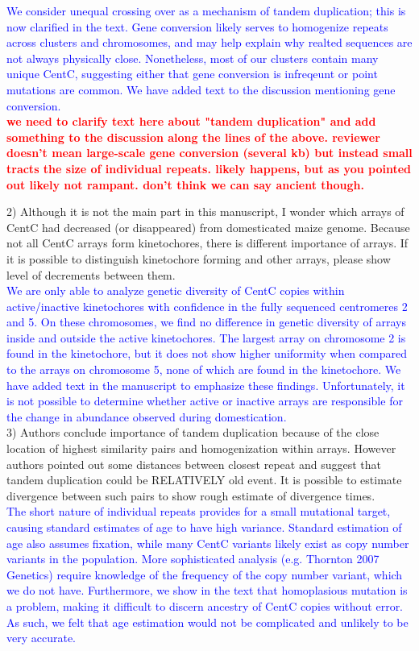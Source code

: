 \documentclass[]{article}
\newcommand{\res}[1]{\noindent \textcolor{blue}{{#1}} \\}
\newcommand{\jri}[1]{\textcolor{red}{{\bf #1}} }
\begin{document}
\res{We consider unequal crossing over as a mechanism of tandem duplication; this is now clarified in the text.
Gene conversion likely serves to homogenize repeats across clusters and chromosomes, and may help explain why realted sequences are not always physically close.
Nonetheless, most of our clusters contain many unique CentC, suggesting either that gene conversion is infreqeunt or point mutations are common. 
We have added text to the discussion mentioning gene conversion.} 
\jri{we need to clarify text here about "tandem duplication" and add something to the discussion along the lines of the above.  reviewer doesn't mean large-scale gene conversion (several kb) but instead small tracts the size of individual repeats.  likely happens, but as you pointed out likely not rampant.  don't think we can say ancient though.\\} 

2) Although it is not the main part in this manuscript, I wonder which arrays of CentC had decreased (or disappeared) from domesticated maize genome. Because not all CentC arrays form kinetochores, there is different importance of arrays. If it is possible to distinguish kinetochore forming and other arrays, please show level of decrements between them.\\

\res{We are only able to analyze genetic diversity of CentC copies within active/inactive kinetochores with confidence in the fully sequenced centromeres 2 and 5.  
On these chromosomes, we find no difference in genetic diversity of arrays inside and outside the active kinetochores.  
The largest array on chromosome 2 is found in the kinetochore, but it does not show higher uniformity when compared to the arrays on chromosome 5, none of which are found in the kinetochore.  
We have added text in the manuscript to emphasize these findings.
Unfortunately, it is not possible to determine whether active or inactive arrays are responsible for the change in abundance observed during domestication.}

3) Authors conclude importance of tandem duplication because of the close location of highest similarity pairs and homogenization within arrays. However authors pointed out some distances between closest repeat and suggest that tandem duplication could be RELATIVELY old event. It is possible to estimate divergence between such pairs to show rough estimate of divergence times.\\

\res{The short nature of individual repeats provides for a small mutational target, causing standard estimates of age to have high variance.  
Standard estimation of age also assumes fixation, while many CentC variants likely exist as copy number variants in the population. 
More sophisticated analysis (e.g. Thornton 2007 Genetics) require knowledge of the frequency of the copy number variant, which we do not have.
Furthermore, we show in the text that homoplasious mutation is a problem, making it difficult to discern ancestry of CentC copies without error.  
As such, we felt that age estimation would not be complicated and unlikely to be very accurate.}
\end{document}

